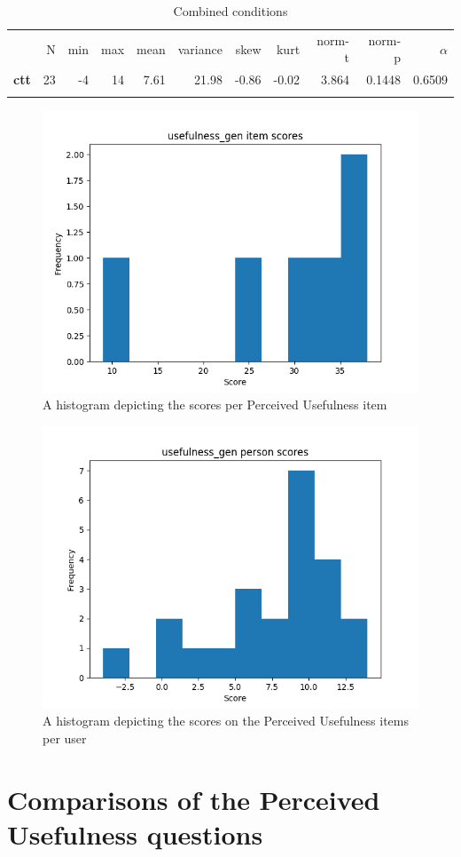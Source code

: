 \begin{longtable}[c]{@{}lrrrrrrrrrr@{}}
\caption{Combined conditions}
\endfirsthead
\toprule\addlinespace
& N & min & max & mean & variance & skew & kurt & norm-t &
norm-p & $\alpha$
\\\addlinespace
\midrule
\textbf{ctt} & 23 & -4 & 14 & 7.61 & 21.98 & -0.86 & -0.02 & 3.864 &
0.1448 & 0.6509
\\\addlinespace
\bottomrule
    \label{tab:usefulness_gen}
\end{longtable}

\begin{figure}
    \centering
    \includegraphics[width=.7\textwidth]{img/usefulness_gen_diff.png}
    \caption{A histogram depicting the scores per Perceived Usefulness item}
    \label{fig:usefulness_gen_diff}
\end{figure}
\begin{figure}
    \centering
    \includegraphics[width=.7\textwidth]{img/usefulness_gen_abil.png}
    \caption{A histogram depicting the scores on the Perceived Usefulness items per user}
    \label{fig:usefulness_gen_abil}
\end{figure}

\section{Comparisons of the Perceived Usefulness questions}

